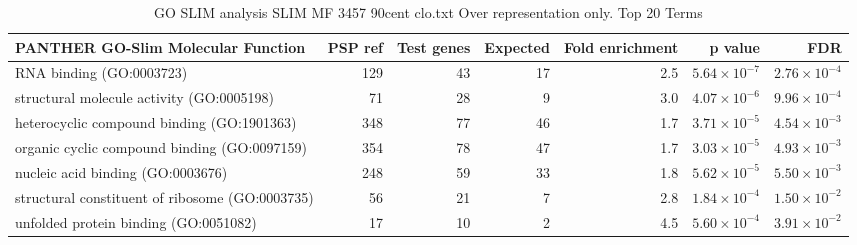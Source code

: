 \begin{table}[ht]
\centering
\begin{adjustbox}{width=\textwidth}


\begin{tabular}{lrrrrrr}
  \hline
PANTHER GO-Slim Molecular Function & PSP ref & Test genes & Expected & Fold enrichment & p value & FDR \\ 
  \hline
RNA binding (GO:0003723) & 129 & 43 & 17 & 2.5 & $5.64 \times 10^{-7}$ & $2.76 \times 10^{-4}$ \\ 
  structural molecule activity (GO:0005198) & 71 & 28 & 9 & 3.0 & $4.07 \times 10^{-6}$ & $9.96 \times 10^{-4}$ \\ 
  heterocyclic compound binding (GO:1901363) & 348 & 77 & 46 & 1.7 & $3.71 \times 10^{-5}$ & $4.54 \times 10^{-3}$ \\ 
  organic cyclic compound binding (GO:0097159) & 354 & 78 & 47 & 1.7 & $3.03 \times 10^{-5}$ & $4.93 \times 10^{-3}$ \\ 
  nucleic acid binding (GO:0003676) & 248 & 59 & 33 & 1.8 & $5.62 \times 10^{-5}$ & $5.50 \times 10^{-3}$ \\ 
  structural constituent of ribosome (GO:0003735) & 56 & 21 & 7 & 2.8 & $1.84 \times 10^{-4}$ & $1.50 \times 10^{-2}$ \\ 
  unfolded protein binding (GO:0051082) & 17 & 10 & 2 & 4.5 & $5.60 \times 10^{-4}$ & $3.91 \times 10^{-2}$ \\ 
   \hline
\end{tabular}
\end{adjustbox}
\caption{GO SLIM analysis SLIM MF 3457 90cent clo.txt Over representation only. Top 20 Terms} 
\label{tab:GO SLIM analysis SLIM MF 3457 90cent clo.txt Over representation only. Top 20 Terms}
\end{table}

